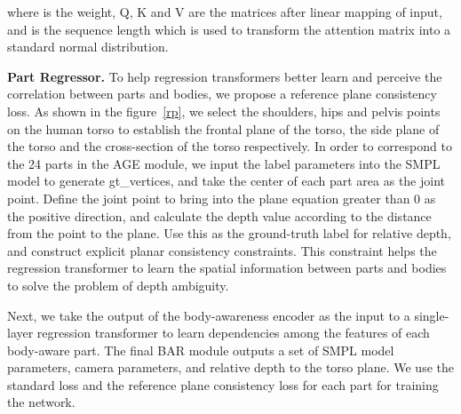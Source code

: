 \documentclass[10pt,twocolumn,letterpaper]{article}
\begin{document}
where  is the weight, Q, K and V are the matrices after linear mapping of input, and  is the sequence length which is used to transform the attention matrix into a standard normal distribution.

\noindent\textbf{Part Regressor.}
To help regression transformers better learn and perceive the correlation between parts and bodies, we propose a reference plane consistency loss. As shown in the figure~\ref{rp}, we select the shoulders, hips and pelvis points on the human torso to establish the frontal plane of the torso, the side plane of the torso and the cross-section of the torso respectively. In order to correspond to the 24 parts in the AGE module, we input the label parameters into the SMPL model to generate gt\_vertices, and take the center of each part area as the joint point. Define the joint point to bring into the plane equation greater than 0 as the positive direction, and calculate the depth value according to the distance from the point to the plane. Use this as the ground-truth label for relative depth, and construct explicit planar consistency constraints. This constraint helps the regression transformer to learn the spatial information between parts and bodies to solve the problem of depth ambiguity.

Next, we take the output of the body-awareness encoder as the input to a single-layer regression transformer to learn dependencies among the features of each body-aware part. The final BAR module outputs a set of SMPL model parameters, camera parameters, and relative depth  to the torso plane. We use the standard loss and the reference plane consistency loss for each part for training the network. 
\end{document}
